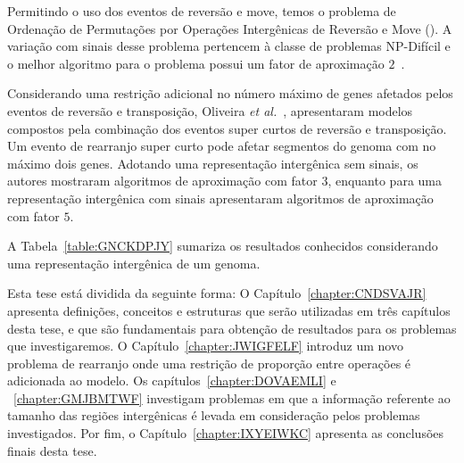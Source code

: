 Permitindo o uso dos eventos de reversão e move, temos o problema de Ordenação de Permutações por Operações Intergênicas de Reversão e Move (\SbIRM). A variação com sinais desse problema pertencem à classe de problemas NP-Difícil e o melhor algoritmo para o problema possui um fator de aproximação $2$~\cite{2022b-brito-etal}.

Considerando uma restrição adicional no número máximo de genes afetados pelos eventos de reversão e transposição, Oliveira \textit{et al.}~\cite{2019c-oliveira-etal}, apresentaram modelos compostos pela combinação dos eventos super curtos de reversão e transposição. Um evento de rearranjo super curto pode afetar segmentos do genoma com no máximo dois genes. Adotando uma representação intergênica sem sinais, os autores mostraram algoritmos de aproximação com fator $3$, enquanto para uma representação intergênica com sinais apresentaram algoritmos de aproximação com fator $5$.

A Tabela~\ref{table:GNCKDPJY} sumariza os resultados conhecidos considerando uma representação intergênica de um genoma.



Esta tese está dividida da seguinte forma: O Capítulo~\ref{chapter:CNDSVAJR} apresenta definições, conceitos e estruturas que serão utilizadas em três capítulos desta tese, e que são fundamentais para obtenção de resultados para os problemas que investigaremos. O Capítulo~\ref{chapter:JWIGFELF} introduz um novo problema de rearranjo onde uma restrição de proporção entre operações é adicionada ao modelo. Os capítulos~\ref{chapter:DOVAEMLI} e ~\ref{chapter:GMJBMTWF} investigam problemas em que a informação referente ao tamanho das regiões intergênicas é levada em consideração pelos problemas investigados. Por fim, o Capítulo~\ref{chapter:IXYEIWKC} apresenta as conclusões finais desta tese. 


